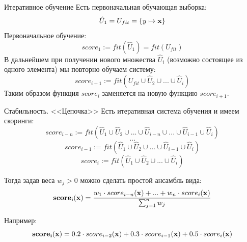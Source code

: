 \begin{frame}{Итеративное обучение}
	\small
	Есть первоначальная обучающая выборка: 
	\begin{equation*}
	\hat U_1 = U_{fit} = \left\{ y \mapsto \bold x  \right\}
	\end{equation*}
	Первоначальное обучение:
	\begin{equation*}
	score_1 :=   fit (\hat U_{1}) = fit (U_{fit}) 
	\end{equation*} 
	В дальнейшем при получении нового множества $\hat U_{i}$ (возможно состоящее из одного элемента)
	мы повторно обучаем систему:
	\begin{equation}
	score_{i+1} := fit ( U_{fit} \cup \hat U_2 \cup ... \cup  \hat U_{i}) 
	\end{equation} 
	Таким образом функция $score_i$ заменяется на новую функцию $score_{i+1}$.
\end{frame}

\begin{frame}
\end{frame}

\begin{frame}{Стабильность. <<Цепочка>>}\label{frame:chain_score}
	Есть итеративная система обучения и имеем скоринги:
	\begin{equation*}
	score_{i-n} := fit ( \hat U_{1} \cup \hat U_2 \cup ... \cup  \hat U_{i-n} \cup ... \cup \hat U_{i-1} \cup \hat U_{i}) 
	\end{equation*}
	\begin{equation*}
	...
	\end{equation*}
	\begin{equation*}
	score_{i-1} := fit ( \hat U_{1} \cup \hat U_2 \cup ... \cup  \hat U_{i-1} \cup \hat U_{i}) 
	\end{equation*}
	\begin{equation*}
	score_{i} := fit ( \hat U_{1} \cup \hat U_2 \cup ... \cup  \hat U_{i}) 
	\end{equation*}
	
	Тогда задав веса $w_j > 0$ можно сделать простой ансамбль вида:
	\begin{equation*}
	\bold {score_{i}}(\bold x) = \frac{w_1 \cdot score_{i-n}(\bold x) + ... + w_n \cdot score_{i}(\bold x)}{\sum_{j=1}^{n} w_j} 
	\end{equation*}
	
	Например:
	\begin{equation*}
	\bold {score_{i}}(\bold x) = 
		0.2 \cdot score_{i-2}(\bold x) 
		+ 0.3 \cdot score_{i-1}(\bold x) 
		+ 0.5 \cdot score_{i}(\bold x) 
	\end{equation*}
\end{frame}


